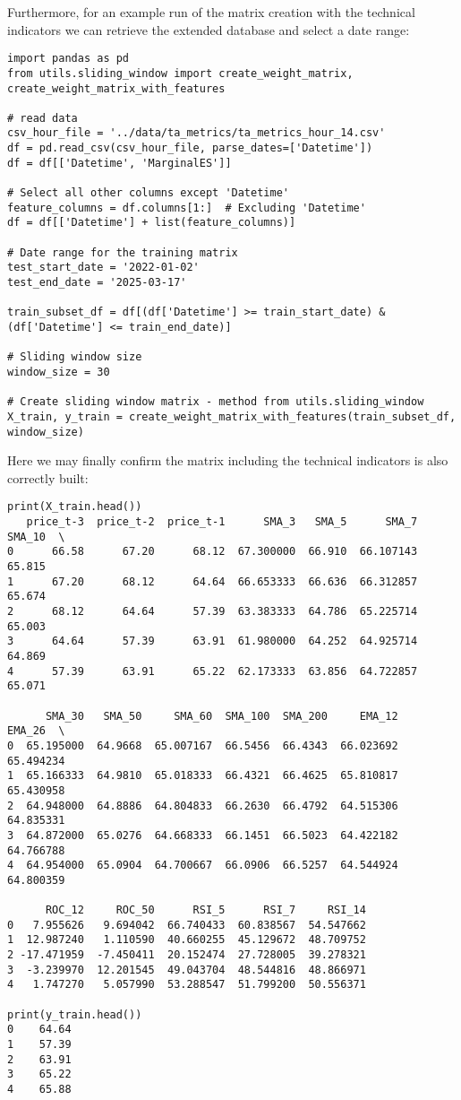 \documentclass[12pt]{report} %
\begin{document}
Furthermore, for an example run of the matrix creation with the technical indicators we can retrieve the extended database and select a date range:
\begin{lstlisting}
import pandas as pd
from utils.sliding_window import create_weight_matrix, create_weight_matrix_with_features

# read data
csv_hour_file = '../data/ta_metrics/ta_metrics_hour_14.csv'
df = pd.read_csv(csv_hour_file, parse_dates=['Datetime'])
df = df[['Datetime', 'MarginalES']]

# Select all other columns except 'Datetime'
feature_columns = df.columns[1:]  # Excluding 'Datetime'
df = df[['Datetime'] + list(feature_columns)]

# Date range for the training matrix
test_start_date = '2022-01-02'
test_end_date = '2025-03-17'

train_subset_df = df[(df['Datetime'] >= train_start_date) & (df['Datetime'] <= train_end_date)]

# Sliding window size
window_size = 30

# Create sliding window matrix - method from utils.sliding_window
X_train, y_train = create_weight_matrix_with_features(train_subset_df, window_size)
\end{lstlisting}

Here we may finally confirm the matrix including the technical indicators is also correctly built:
\begin{small}
\begin{verbatim}
print(X_train.head())
   price_t-3  price_t-2  price_t-1      SMA_3   SMA_5      SMA_7  SMA_10  \
0      66.58      67.20      68.12  67.300000  66.910  66.107143  65.815   
1      67.20      68.12      64.64  66.653333  66.636  66.312857  65.674   
2      68.12      64.64      57.39  63.383333  64.786  65.225714  65.003   
3      64.64      57.39      63.91  61.980000  64.252  64.925714  64.869   
4      57.39      63.91      65.22  62.173333  63.856  64.722857  65.071   

      SMA_30   SMA_50     SMA_60  SMA_100  SMA_200     EMA_12     EMA_26  \
0  65.195000  64.9668  65.007167  66.5456  66.4343  66.023692  65.494234   
1  65.166333  64.9810  65.018333  66.4321  66.4625  65.810817  65.430958   
2  64.948000  64.8886  64.804833  66.2630  66.4792  64.515306  64.835331   
3  64.872000  65.0276  64.668333  66.1451  66.5023  64.422182  64.766788   
4  64.954000  65.0904  64.700667  66.0906  66.5257  64.544924  64.800359   

      ROC_12     ROC_50      RSI_5      RSI_7     RSI_14  
0   7.955626   9.694042  66.740433  60.838567  54.547662  
1  12.987240   1.110590  40.660255  45.129672  48.709752  
2 -17.471959  -7.450411  20.152474  27.728005  39.278321  
3  -3.239970  12.201545  49.043704  48.544816  48.866971  
4   1.747270   5.057990  53.288547  51.799200  50.556371

print(y_train.head())
0    64.64
1    57.39
2    63.91
3    65.22
4    65.88
\end{verbatim}
\end{small}
\end{document}
